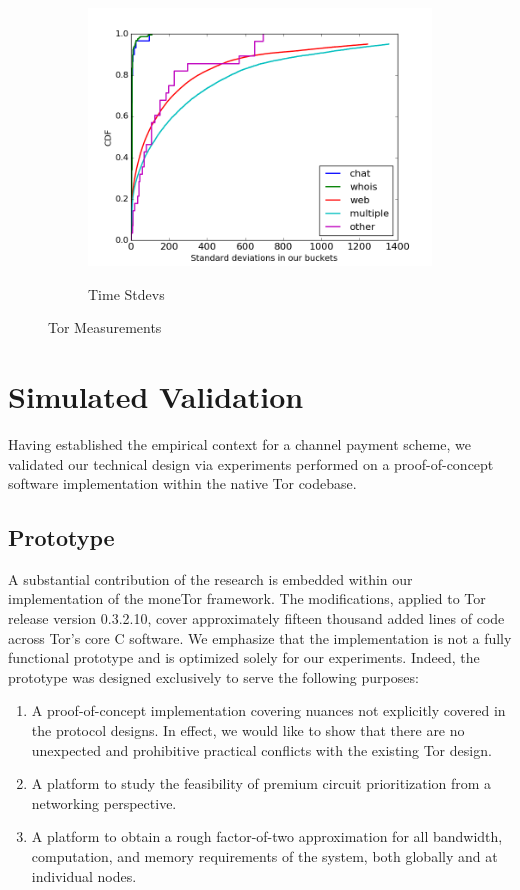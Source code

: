 \begin{figure}
\begin{subfigure}[t]{0.32\textwidth}
\includegraphics[scale=0.3]{images/stddevs.png}
		\label{fig:stats_c}
		\caption{Time Stdevs}
	\end{subfigure}
	\label{fig:measurements}
	\caption{Tor Measurements}
\end{figure}

\section{Simulated Validation}

Having established the empirical context for a channel payment scheme, we
validated our technical design via experiments performed on a proof-of-concept
software implementation within the native Tor codebase.

\subsection{Prototype}

A substantial contribution of the research is embedded within our implementation
of the moneTor framework. The modifications, applied to Tor release version
0.3.2.10, cover approximately fifteen thousand added lines of code across Tor's
core C software. We emphasize that the implementation is not a fully functional
prototype and is optimized solely for our experiments. Indeed, the prototype was
designed exclusively to serve the following purposes:

\begin{enumerate}
\item A proof-of-concept implementation covering nuances not explicitly
  covered in the protocol designs. In effect, we would like to show that there
  are no unexpected and prohibitive practical conflicts with the existing Tor
  design.
\item A platform to study the feasibility of premium circuit
  prioritization from a networking perspective.
\item A platform to obtain a rough factor-of-two approximation for all
  bandwidth, computation, and memory requirements of the system, both globally
  and at individual nodes.
\end{enumerate}

